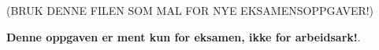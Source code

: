 

(BRUK DENNE FILEN SOM MAL FOR NYE EKSAMENSOPPGAVER!)














{\bf Denne oppgaven er ment kun for eksamen, ikke for arbeidsark!}.

